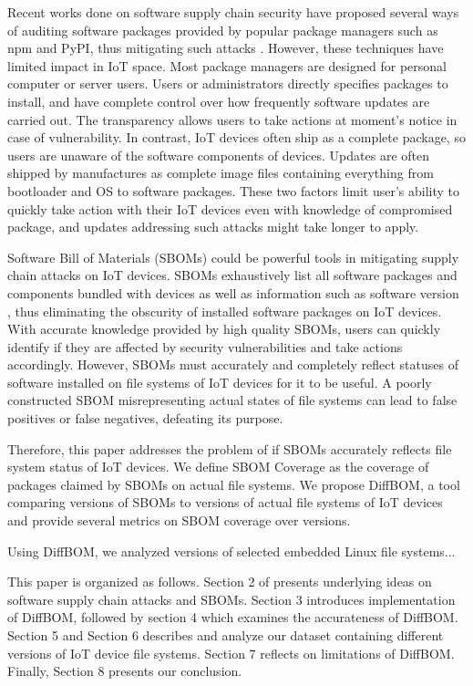 Recent works done on software supply chain security have proposed several ways
of auditing software packages provided by popular package managers such as npm
and PyPI, thus mitigating such attacks \cite{Taxonomy, Towards_Measure,
Towards_Using, What_are_npm, Phantom_artifacts}. However, these techniques have
limited impact in IoT space. Most package managers are designed for personal
computer or server users. Users or administrators directly specifies packages
to install, and have complete control over how frequently software updates are
carried out. The transparency allows users to take actions at moment's notice
in case of vulnerability. In contrast, IoT devices often ship as a complete
package, so users are unaware of the software components of devices. Updates
are often shipped by manufactures as complete image files containing everything
from bootloader and OS to software packages. These two factors limit user's
ability to quickly take action with their IoT devices even with knowledge of
compromised package, and updates addressing such attacks might take longer to
apply.\par

Software Bill of Materials (SBOMs) could be powerful tools in mitigating supply
chain attacks on IoT devices. SBOMs exhaustively list all software packages and
components bundled with devices as well as information such as software version
\cite{What_is_a_sbom}, thus eliminating the obscurity of installed software
packages on IoT devices. With accurate knowledge provided by high quality
SBOMs, users can quickly identify if they are affected by security
vulnerabilities and take actions accordingly. However, SBOMs must accurately
and completely reflect statuses of software installed on file systems of IoT
devices for it to be useful. A poorly constructed SBOM misrepresenting actual
states of file systems can lead to false positives or false negatives,
defeating its purpose.\par
 
Therefore, this paper addresses the problem of if SBOMs accurately reflects
file system status of IoT devices. We define SBOM Coverage as the coverage of
packages claimed by SBOMs on actual file systems. We propose DiffBOM, a tool
comparing versions of SBOMs to versions of actual file systems of IoT devices
and provide several metrics on SBOM coverage over versions.\par

Using DiffBOM, we analyzed versions of selected embedded Linux file systems... \par

This paper is organized as follows. Section 2 of presents underlying ideas on
software supply chain attacks and SBOMs. Section 3 introduces implementation of
DiffBOM, followed by section 4 which examines the accurateness of DiffBOM.
Section 5 and Section 6 describes and analyze our dataset containing different
versions of IoT device file systems. Section 7 reflects on limitations of
DiffBOM. Finally, Section 8 presents our conclusion.


